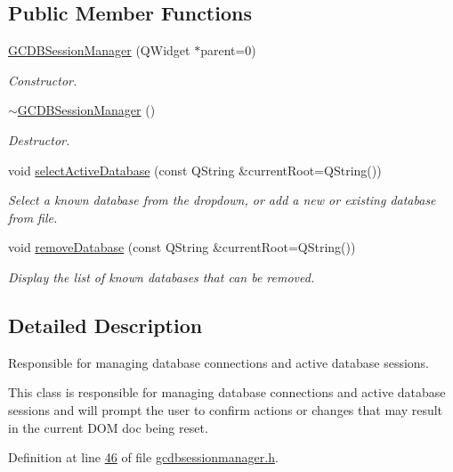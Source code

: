\subsection*{\-Public \-Member \-Functions}
\begin{DoxyCompactItemize}
\item 
\hyperlink{class_g_c_d_b_session_manager_ae9bbc80ab3d7235f804393ea1b4e9f36}{\-G\-C\-D\-B\-Session\-Manager} (\-Q\-Widget $\ast$parent=0)
\begin{DoxyCompactList}\small\item\em \-Constructor. \end{DoxyCompactList}\item 
\hyperlink{class_g_c_d_b_session_manager_a95698026afd73f32557483f3fc19b419}{$\sim$\-G\-C\-D\-B\-Session\-Manager} ()
\begin{DoxyCompactList}\small\item\em \-Destructor. \end{DoxyCompactList}\item 
void \hyperlink{class_g_c_d_b_session_manager_ac4e5a25619ee77bc9307d3428bfd345d}{select\-Active\-Database} (const \-Q\-String \&current\-Root=\-Q\-String())
\begin{DoxyCompactList}\small\item\em \-Select a known database from the dropdown, or add a new or existing database from file. \end{DoxyCompactList}\item 
void \hyperlink{class_g_c_d_b_session_manager_a0fc44e9d2efb407cc0964295920b2432}{remove\-Database} (const \-Q\-String \&current\-Root=\-Q\-String())
\begin{DoxyCompactList}\small\item\em \-Display the list of known databases that can be removed. \end{DoxyCompactList}\end{DoxyCompactItemize}


\subsection{\-Detailed \-Description}
\-Responsible for managing database connections and active database sessions. 

\-This class is responsible for managing database connections and active database sessions and will prompt the user to confirm actions or changes that may result in the current \-D\-O\-M doc being reset. 

\-Definition at line \hyperlink{gcdbsessionmanager_8h_source_l00046}{46} of file \hyperlink{gcdbsessionmanager_8h_source}{gcdbsessionmanager.\-h}.



